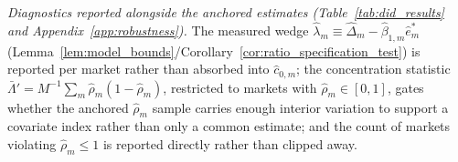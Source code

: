 \medskip
\noindent\textit{Diagnostics reported alongside the anchored estimates
(Table~\ref{tab:did_results} and Appendix~\ref{app:robustness}).} The measured wedge
$\hat\lambda_m\equiv\hat\Delta_m-\hat\beta_{1,m}\hat e^*_m$
(Lemma~\ref{lem:model_bounds}/Corollary~\ref{cor:ratio_specification_test}) is reported per
market rather than absorbed into $\hat c_{0,m}$; the concentration statistic
$\bar\Lambda'=M^{-1}\sum_m\hat\rho_m(1-\hat\rho_m)$, restricted to markets with
$\hat\rho_m\in[0,1]$, gates whether the anchored $\hat\rho_m$ sample carries enough interior
variation to support a covariate index rather than only a common estimate; and the count of
markets violating $\hat\rho_m\le1$ is reported directly rather than clipped away.
